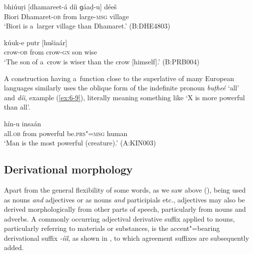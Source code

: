 \begin{exe}
\ex
\label{ex:6-7}
\gll bhiúuṛi [dhamareet-á díi ɡáaḍ-u] déeš \\
Biori Dhamaret-\textsc{ob} from large-\textsc{msg} village \\
\glt `Biori is a~larger village than Dhamaret.' (B:DHE4803)

\ex
\label{ex:6-8}
 kúuk-e putr [hušiaár] \\
crow-\textsc{ob} from crow-\textsc{gn} son wise  \\
\glt `The son of a~crow is wiser than the crow [himself].' (B:PRB004)
\end{exe}

A construction having a~function close to the superlative of many European languages similarly uses the oblique form of the indefinite pronoun \textit{buṭheé} `all' and \textit{díi}, example (\ref{ex:6-9}), literally meaning something like `X is more powerful than all'.

\begin{exe}
\ex
\label{ex:6-9}
 hín-u insaán \\
all.\textsc{ob} from powerful be.\textsc{prs"=msg} human \\
\glt `Man is the most powerful (creature).' (A:KIN003)
\end{exe}

\subsection{Derivational morphology}
\label{subsec:6-3-4}

Apart from the general flexibility of some words, as we saw above (), being used as nouns \textit{and} adjectives or as nouns \textit{and} participials etc., adjectives may also be derived morphologically from other parts of speech, particularly from nouns and adverbs. A commonly occurring adjectival derivative suffix applied to nouns, particularly referring to materials or substances, is the accent"=bearing derivational suffix \textit{-íil}, as shown in , to which agreement suffixes are subsequently added.


